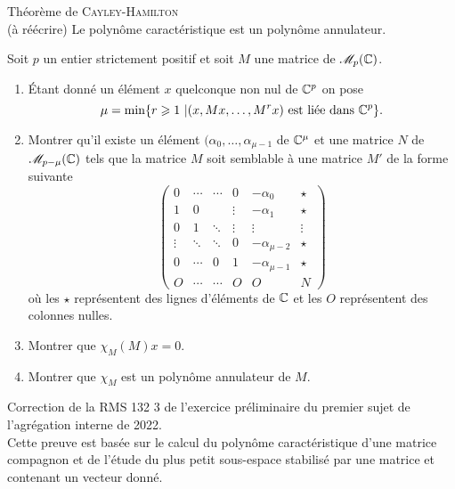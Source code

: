 \begin{tcolorbox}
    Théorème de \textsc{Cayley}-\textsc{Hamilton} \\
    (à réécrire) Le polynôme caractéristique est un polynôme annulateur.
\end{tcolorbox}


\begin{exercice}
    Soit $p$ un entier strictement positif et soit $M$ une matrice de $\mathscr{M}_p(\mathbb{C})$.
    \begin{enumerate}
        \item Étant donné un élément $x$ quelconque non nul de $\mathbb{C}^p$ on pose
        $$\mu = \min \{ r \geqslant 1\ | (x, Mx, \dots, M^r x) \text{ est liée dans } \mathbb{C}^p\}.$$
        \item Montrer qu'il existe un élément $(\alpha_0, \dots, \alpha_{\mu-1}$ de $\mathbb{C}^{\mu}$ et une matrice $N$ de $\mathscr{M}_{p-\mu}(\mathbb{C})$ tels que la matrice $M$ soit semblable à une matrice $M'$ de la forme suivante
        $$
        \begin{pmatrix}
        0 & \cdots & \cdots & 0 & -\alpha_0 & \star \\
        1 & 0 & & \vdots & -\alpha_1 & \star \\
        0 & 1 & \ddots & \vdots & \vdots & \vdots \\
        \vdots & \ddots & \ddots & 0 & -\alpha_{\mu-2} & \star \\
        0 & \cdots & 0 & 1 & -\alpha_{\mu-1} & \star \\
        O & \cdots & \cdots & O & O & N
        \end{pmatrix}
        $$
        où les $\star$ représentent des lignes d'éléments de $\mathbb{C}$ et les $O$ représentent des colonnes nulles. 
        \item Montrer que $\chi_M(M)x = 0$.
        \item Montrer que $\chi_M$ est un polynôme annulateur de $M$.
    \end{enumerate}
\end{exercice}

\begin{preuve}
    Correction de la RMS 132 3 de l'exercice préliminaire du premier sujet de l'agrégation interne de 2022. \\
    Cette preuve est basée sur le calcul du polynôme caractéristique d'une matrice compagnon et de l'étude du plus petit sous-espace stabilisé par une matrice et contenant un vecteur donné. \\
    
    
\end{preuve}
